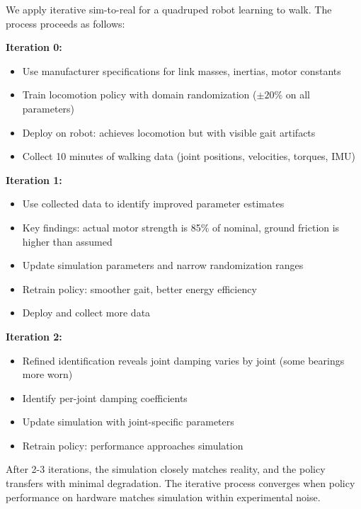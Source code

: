 \begin{example}
\label{ex:iterative_calibration_quadruped}
We apply iterative sim-to-real for a quadruped robot learning to walk. The process proceeds as follows:

\textbf{Iteration 0:}
\begin{itemize}
    \item Use manufacturer specifications for link masses, inertias, motor constants
    \item Train locomotion policy with domain randomization ($\pm 20\%$ on all parameters)
    \item Deploy on robot: achieves locomotion but with visible gait artifacts
    \item Collect 10 minutes of walking data (joint positions, velocities, torques, IMU)
\end{itemize}

\textbf{Iteration 1:}
\begin{itemize}
    \item Use collected data to identify improved parameter estimates
    \item Key findings: actual motor strength is 85\% of nominal, ground friction is higher than assumed
    \item Update simulation parameters and narrow randomization ranges
    \item Retrain policy: smoother gait, better energy efficiency
    \item Deploy and collect more data
\end{itemize}

\textbf{Iteration 2:}
\begin{itemize}
    \item Refined identification reveals joint damping varies by joint (some bearings more worn)
    \item Identify per-joint damping coefficients
    \item Update simulation with joint-specific parameters
    \item Retrain policy: performance approaches simulation
\end{itemize}

After 2-3 iterations, the simulation closely matches reality, and the policy transfers with minimal degradation. The iterative process converges when policy performance on hardware matches simulation within experimental noise.
\end{example}

